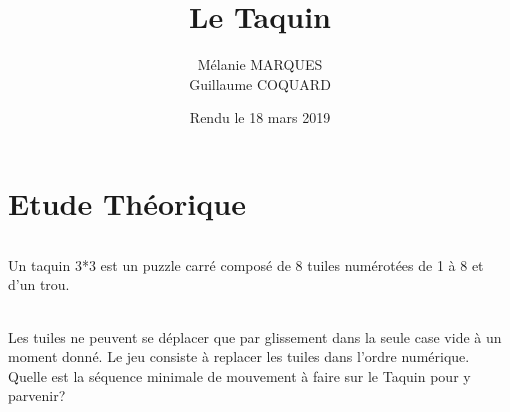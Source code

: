 \documentclass[10pt,a4paper]{report}
\title{Le Taquin}
\author{Mélanie MARQUES \\ Guillaume COQUARD}
\date{Rendu le 18 mars 2019}
\begin{document}
\begin{titlepage}
	\maketitle
\end{titlepage}


\part{Etude Théorique}

\paragraph{}{Un taquin 3*3 est un puzzle carré composé de 8 tuiles numérotées de 1 à 8 et d’un trou.}

\paragraph*{}{Les tuiles ne peuvent se déplacer que par glissement dans la seule case vide à un moment donné. Le jeu consiste à replacer les tuiles dans l’ordre numérique. Quelle est la séquence minimale de mouvement à faire sur le Taquin pour y parvenir?}
\end{document}
